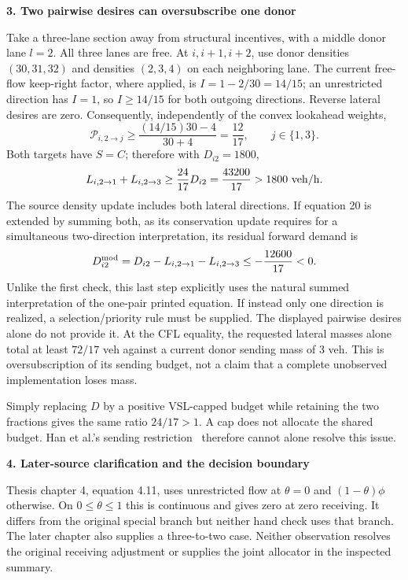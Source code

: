 \documentclass[10pt,a4paper]{article}
\newcommand{\head}[1]{\par\medskip\textbf{#1}\par}
\newcommand{\Prule}{\mathcal P}
\begin{document}
\head{3. Two pairwise desires can oversubscribe one donor}
Take a three-lane section away from structural incentives, with a middle
donor lane $l=2$. All three lanes are free. At $i,i+1,i+2$, use donor
densities $(30,31,32)$ and densities $(2,3,4)$ on each neighboring lane.
The current free-flow keep-right factor, where applied, is
$I=1-2/30=14/15$; an unrestricted direction has $I=1$, so $I\geq14/15$
for both outgoing directions. Reverse lateral desires are zero.
Consequently, independently of the convex lookahead weights,
\begin{equation}
 \Prule_{i,2\to j}\geq
 \frac{(14/15)30-4}{30+4}=\frac{12}{17},\qquad j\in\{1,3\}.
 \label{eq:two}
\end{equation}
Both targets have $S=C$; therefore with $D_{i2}=1800$,
\begin{equation}
 L_{i,2\to1}+L_{i,2\to3}\geq\frac{24}{17}D_{i2}
 =\frac{43200}{17}>1800\ {\rm veh/h}. \label{eq:overbudget}
\end{equation}
The source density update includes both lateral directions. If equation 20
is extended by summing both, as its conservation update requires for a
simultaneous two-direction interpretation, its residual forward demand is
\begin{equation}
 D^{\rm mod}_{i2}=D_{i2}-L_{i,2\to1}-L_{i,2\to3}
 \leq-\frac{12600}{17}<0. \label{eq:residual}
\end{equation}
Unlike the first check, this last step explicitly uses the natural summed
interpretation of the one-pair printed equation. If instead only one
direction is realized, a selection/priority rule must be supplied. The
displayed pairwise desires alone do not provide it. At the CFL equality,
the requested lateral masses alone total at least $72/17$ veh against a
current donor sending mass of 3 veh. This is oversubscription of its sending
budget, not a claim that a complete unobserved implementation loses mass.

Simply replacing $D$ by a positive VSL-capped budget while retaining the
two fractions gives the same ratio $24/17>1$. A cap does not allocate the
shared budget. Han et al.'s sending restriction~\cite{han} therefore cannot
alone resolve this issue.

\head{4. Later-source clarification and the decision boundary}
Thesis chapter 4, equation 4.11, uses unrestricted flow at $\theta=0$ and
$(1-\theta)\phi$ otherwise. On $0\leq\theta\leq1$ this is continuous and
gives zero at zero receiving. It differs from the original special branch
but neither hand check uses that branch. The later chapter also supplies
a three-to-two case. Neither observation resolves the original receiving
adjustment or supplies the joint allocator in the inspected summary.
\end{document}
